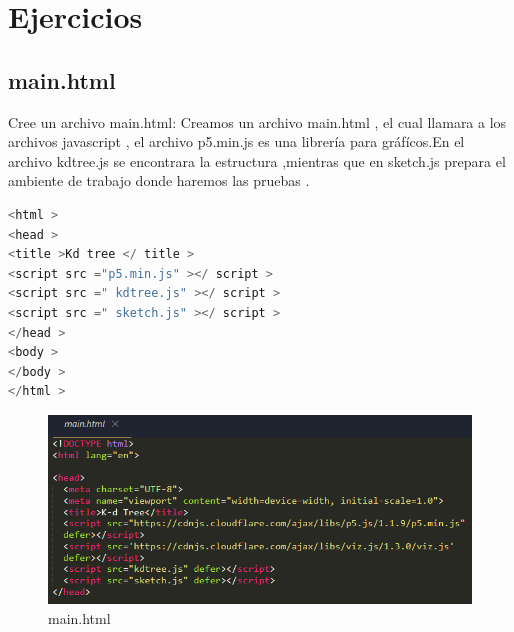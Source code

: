 \section{Ejercicios}
\subsection{main.html}
Cree un archivo main.html:
Creamos un archivo main.html , el cual llamara a los archivos  javascript , el archivo p5.min.js es una librería para gráfícos.En el archivo kdtree.js se encontrara la estructura ,mientras que en sketch.js prepara el ambiente de trabajo donde haremos las pruebas .
\begin{lstlisting}[language=c++,
                   directivestyle={\color{black}}
                   emph={int,char,double,float,unsigned},
                   emphstyle={\color{blue}}
                  ]
<html >
<head >
<title >Kd tree </ title >
<script src ="p5.min.js" ></ script >
<script src =" kdtree.js" ></ script >
<script src =" sketch.js" ></ script >
</head >
<body >
</body >
</html >
\end{lstlisting}

\begin{figure}[H]
  \centering
  \includegraphics[width=1\textwidth]{images/uno.PNG}
  \caption{main.html}
  \label{fig:act-1}
\end{figure}

